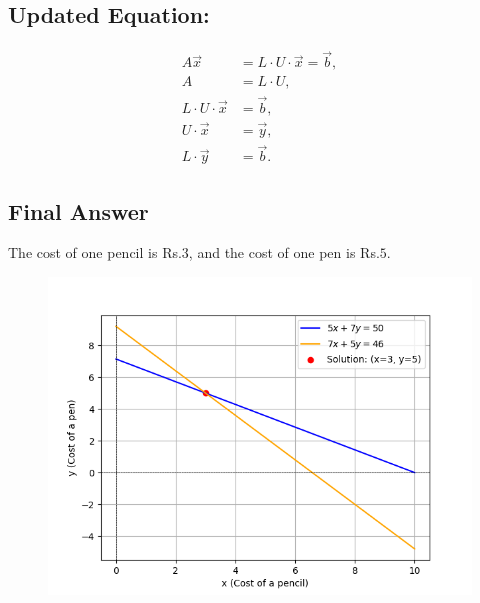 \documentclass[journal]{IEEEtran}
\begin{document}
\subsection{Updated Equation:}
\begin{align}
    A\vec{x} &= L \cdot U \cdot \vec{x} = \vec{b}, \\
    A &= L \cdot U, \\
    L \cdot U \cdot \vec{x} &= \vec{b}, \\
    U \cdot \vec{x} &= \vec{y}, \\
    L \cdot \vec{y} &= \vec{b}.
\end{align}
\subsection{Final Answer}
The cost of one pencil is Rs.\(3\), and the cost of one pen is Rs.\(5\).

\begin{figure}[h!]
   \centering
   \includegraphics[width=0.7\columnwidth]{figs/fig.png}
    
\end{figure}
\end{document}
